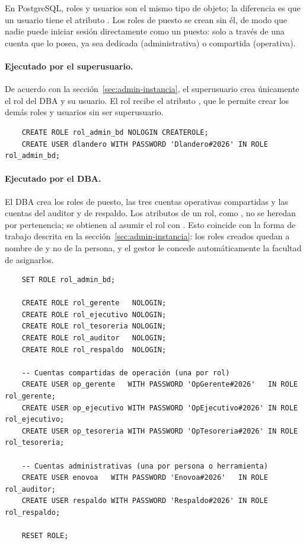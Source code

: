 En PostgreSQL, roles y usuarios son el mismo tipo de objeto; la diferencia es que un usuario tiene el atributo . Los roles de puesto se crean sin él, de modo que nadie puede iniciar sesión directamente como un puesto: solo a través de una cuenta que lo posea, ya sea dedicada (administrativa) o compartida (operativa).

\paragraph{Ejecutado por el superusuario.} De acuerdo con la sección~\ref{sec:admin-instancia}, el superusuario crea únicamente el rol del DBA y su usuario. El rol recibe el atributo , que le permite crear los demás roles y usuarios sin ser superusuario.

\begin{verbatim}
	CREATE ROLE rol_admin_bd NOLOGIN CREATEROLE;
	CREATE USER dlandero WITH PASSWORD 'Dlandero#2026' IN ROLE rol_admin_bd;
\end{verbatim}

\paragraph{Ejecutado por el DBA.} El DBA crea los roles de puesto, las tres cuentas operativas compartidas y las cuentas del auditor y de respaldo. Los atributos de un rol, como , no se heredan por pertenencia; se obtienen al asumir el rol con . Esto coincide con la forma de trabajo descrita en la sección~\ref{sec:admin-instancia}: los roles creados quedan a nombre de  y no de la persona, y el gestor le concede automáticamente la facultad de asignarlos.

\begin{verbatim}
	SET ROLE rol_admin_bd;
	
	CREATE ROLE rol_gerente   NOLOGIN;
	CREATE ROLE rol_ejecutivo NOLOGIN;
	CREATE ROLE rol_tesoreria NOLOGIN;
	CREATE ROLE rol_auditor   NOLOGIN;
	CREATE ROLE rol_respaldo  NOLOGIN;
	
	-- Cuentas compartidas de operación (una por rol)
	CREATE USER op_gerente   WITH PASSWORD 'OpGerente#2026'   IN ROLE rol_gerente;
	CREATE USER op_ejecutivo WITH PASSWORD 'OpEjecutivo#2026' IN ROLE rol_ejecutivo;
	CREATE USER op_tesoreria WITH PASSWORD 'OpTesoreria#2026' IN ROLE rol_tesoreria;
	
	-- Cuentas administrativas (una por persona o herramienta)
	CREATE USER enovoa   WITH PASSWORD 'Enovoa#2026'   IN ROLE rol_auditor;
	CREATE USER respaldo WITH PASSWORD 'Respaldo#2026' IN ROLE rol_respaldo;
	
	RESET ROLE;
\end{verbatim}

